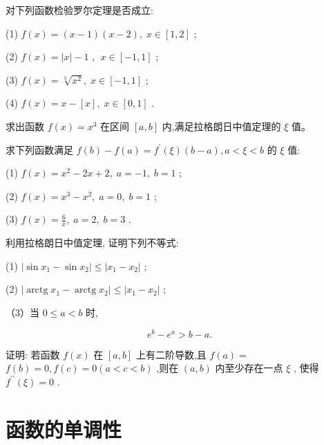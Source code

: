 \documentclass[lang=cn,newtx,10pt,scheme=chinese]{elegantbook}
\begin{document}
\begin{problemset}[习 题 九]

\item 对下列函数检验罗尔定理是否成立:

(1) \(f\left( x\right) = \left( {x - 1}\right) \left( {x - 2}\right) ,\;x \in \left\lbrack {1,2}\right\rbrack\) ;

(2) \(f\left( x\right) = \left| x\right| - 1\) , \(\;x \in \left\lbrack {-1,1}\right\rbrack\) ;

(3) \(f\left( x\right) = \sqrt[3]{{x}^{2}},\;x \in \left\lbrack {-1,1}\right\rbrack\) ;

(4) \(f\left( x\right) = x - \left\lbrack x\right\rbrack ,\;x \in \left\lbrack {0,1}\right\rbrack\) .

\item 求出函数 \(f\left( x\right) = {x}^{3}\) 在区间 \(\left\lbrack {a,b}\right\rbrack\) 内,满足拉格朗日中值定理的 \(\xi\) 值。

\item 求下列函数满足 \(f\left( b\right) - f\left( a\right) = {f}^{\prime }\left( \xi \right) \left( {b - a}\right) ,a < \xi < b\) 的 \(\xi\) 值:

(1) \(f\left( x\right) = {x}^{2} - {2x} + 2,\;a = - 1,\;b = 1\) ;

(2) \(f\left( x\right) = {x}^{3} - {x}^{2},\;a = 0,\;b = 1\) ;

(3) \(f\left( x\right) = \frac{6}{x},\;a = 2,\;b = 3\) .

\item 利用拉格朗日中值定理, 证明下列不等式:

(1) \(\left| {\sin {x}_{1} - \sin {x}_{2}}\right| \leq \left| {{x}_{1} - {x}_{2}}\right|\) ;

(2) \(\left| {\operatorname{arctg}{x}_{1} - \operatorname{arctg}{x}_{2}}\right| \leq \left| {{x}_{1} - {x}_{2}}\right|\) ;

（3）当 \(0 \leq a < b\) 时,

\[
{e}^{b} - {e}^{a} > b - a.
\]

\item 证明: 若函数 \(f\left( x\right)\) 在 \(\left\lbrack {a,b}\right\rbrack\) 上有二阶导数,且 \(f\left( a\right) =\) \(f\left( b\right) = 0,f\left( c\right) = 0\left( {a < c < b}\right)\) ,则在 \(\left( {a,b}\right)\) 内至少存在一点 \(\xi\) , 使得 \({f}^{\prime \prime }\left( \xi \right) = 0\) .

\end{problemset}

\section{函数的单调性}
\end{document}
